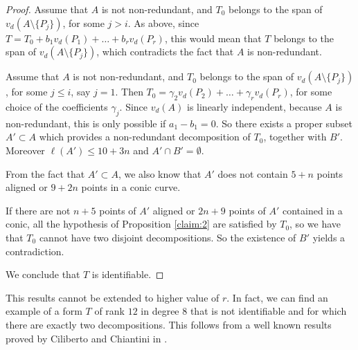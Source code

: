 \documentclass[a4paper,10pt,oneside]{article}
\theoremstyle{casep}
\theoremstyle{definition}
\begin{document}
\begin{proof}
Assume that $A$ is not non-redundant, and $T_0$ belongs to the span of $v_d(A\setminus\{P_j\})$,
for some $j>i$. As above, since $T=T_0+b_1v_d(P_1)+\dots+b_r v_d(P_r)$,
this would mean that $T$ belongs to the span of $v_d(A\setminus\{P_j\})$, which contradicts the fact that $A$ is non-redundant.

Assume that $A$ is not non-redundant, and $T_0$ belongs to the span of $v_d(A\setminus\{P_j\})$,
for some $j\leq i$, say $j=1$. Then $T_0=\gamma_2 v_d(P_2)+\dots+\gamma_{r}v_d(P_{r})$,
for some choice of the coefficients $\gamma_j$. Since $v_d(A)$ is linearly independent, because $A$ is non-redundant,
this is only possible if $a_1-b_1=0$. So there exists a proper subset $A'\subset A$ which provides a non-redundant decomposition of $T_0$, together with $B'$. Moreover $\ell(A')\leq 10+3n$ and $ A' \cap B' =\emptyset$. 


From the fact that $ A' \subset A $, we also know that $ A' $ does not contain $ 5+n $ points aligned or $ 9+2n $ points in a conic curve.


If there are not $ n+5 $ points of $ A' $ aligned or $ 2n+9 $ points of $ A' $ contained in a conic, all the hypothesis of Proposition \ref{claim:2} are satisfied by $ T_0 $, so we have that $T_0$ cannot have two disjoint decompositions. So the existence of $ B' $ yields a contradiction.

 We conclude that $ T $ is identifiable.
 
 
 
\end{proof}

This results cannot be extended to higher value of $ r $. In fact, we can find an example of a form $ T $ of rank $ 12 $ in degree $ 8 $ that is not identifiable and for which there are exactly two decompositions. This follows from a well known results proved by Ciliberto and Chiantini in \cite{CCi06}.
\end{document}
